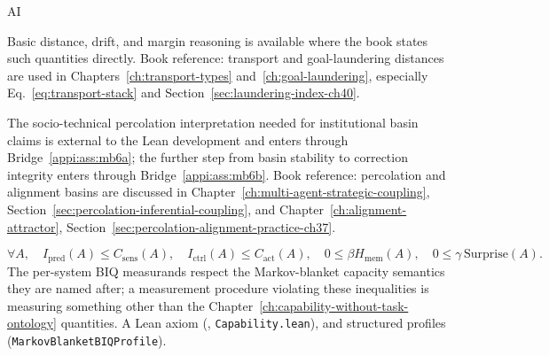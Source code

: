 \begin{authbar}{AI}
\begin{assumption}
\label{appi:ass:s08}
Basic distance, drift, and margin reasoning is available where the book states such quantities directly.
Book reference: transport and goal-laundering distances are used in Chapters~\ref{ch:transport-types} and~\ref{ch:goal-laundering}, especially Eq.~\eqref{eq:transport-stack} and Section~\ref{sec:laundering-index-ch40}.
\end{assumption}

\begin{assumption}
\label{appi:ass:s09}
The socio-technical percolation interpretation needed for institutional basin claims is external to the Lean development and enters through Bridge~\ref{appi:ass:mb6a}; the further step from basin stability to correction integrity enters through Bridge~\ref{appi:ass:mb6b}.
Book reference: percolation and alignment basins are discussed in Chapter~\ref{ch:multi-agent-strategic-coupling}, Section~\ref{sec:percolation-inferential-coupling}, and Chapter~\ref{ch:alignment-attractor}, Section~\ref{sec:percolation-alignment-practice-ch37}.
\end{assumption}

\begin{assumption}
\label{appi:ass:s10}
\begin{equation}
\label{appi:eq:s10}
\forall A,\quad I_{\mathrm{pred}}(A)\le C_{\mathrm{sens}}(A),\quad I_{\mathrm{ctrl}}(A)\le C_{\mathrm{act}}(A),\quad 0\le\beta H_{\mathrm{mem}}(A),\quad 0\le\gamma\,\mathrm{Surprise}(A).
\end{equation}
The per-system BIQ measurands respect the Markov-blanket capacity semantics they are named after; 
a measurement procedure violating these inequalities is measuring something other than the Chapter~\ref{ch:capability-without-task-ontology} quantities.
A Lean axiom (, \texttt{Capability.lean}), and structured profiles (\texttt{MarkovBlanketBIQProfile}).
\end{assumption}

\end{authbar}
\authbarsubneedspace
